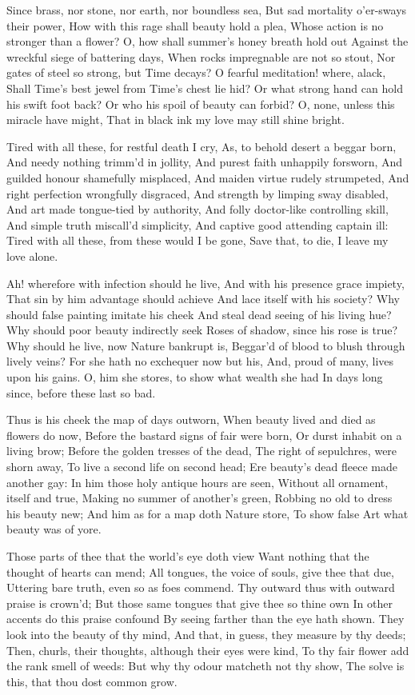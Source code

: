 \documentclass[twocolumn]{book}
\begin{document}
Since brass, nor stone, nor earth, nor boundless sea,
But sad mortality o'er-sways their power,
How with this rage shall beauty hold a plea,
Whose action is no stronger than a flower?
O, how shall summer's honey breath hold out
Against the wreckful siege of battering days,
When rocks impregnable are not so stout,
Nor gates of steel so strong, but Time decays?
O fearful meditation! where, alack,
Shall Time's best jewel from Time's chest lie hid?
Or what strong hand can hold his swift foot back?
Or who his spoil of beauty can forbid?
  O, none, unless this miracle have might,
  That in black ink my love may still shine bright.


Tired with all these, for restful death I cry,
As, to behold desert a beggar born,
And needy nothing trimm'd in jollity,
And purest faith unhappily forsworn,
And guilded honour shamefully misplaced,
And maiden virtue rudely strumpeted,
And right perfection wrongfully disgraced,
And strength by limping sway disabled,
And art made tongue-tied by authority,
And folly doctor-like controlling skill,
And simple truth miscall'd simplicity,
And captive good attending captain ill:
  Tired with all these, from these would I be gone,
  Save that, to die, I leave my love alone.


Ah! wherefore with infection should he live,
And with his presence grace impiety,
That sin by him advantage should achieve
And lace itself with his society?
\numerus*{}Why should false painting imitate his cheek
And steal dead seeing of his living hue?
Why should poor beauty indirectly seek
Roses of shadow, since his rose is true?
Why should he live, now Nature bankrupt is,
Beggar'd of blood to blush through lively veins?
For she hath no exchequer now but his,
And, proud of many, lives upon his gains.
  O, him she stores, to show what wealth she had
  In days long since, before these last so bad.


Thus is his cheek the map of days outworn,
When beauty lived and died as flowers do now,
Before the bastard signs of fair were born,
Or durst inhabit on a living brow;
Before the golden tresses of the dead,
The right of sepulchres, were shorn away,
To live a second life on second head;
Ere beauty's dead fleece made another gay:
In him those holy antique hours are seen,
Without all ornament, itself and true,
Making no summer of another's green,
Robbing no old to dress his beauty new;
  And him as for a map doth Nature store,
  To show false Art what beauty was of yore.


Those parts of thee that the world's eye doth view
Want nothing that the thought of hearts can mend;
All tongues, the voice of souls, give thee that due,
Uttering bare truth, even so as foes commend.
Thy outward thus with outward praise is crown'd;
But those same tongues that give thee so thine own
In other accents do this praise confound
By seeing farther than the eye hath shown.
They look into the beauty of thy mind,
And that, in guess, they measure by thy deeds;
Then, churls, their thoughts, although their eyes were kind,
To thy fair flower add the rank smell of weeds:
  But why thy odour matcheth not thy show,
  The solve is this, that thou dost common grow.
\end{document}
